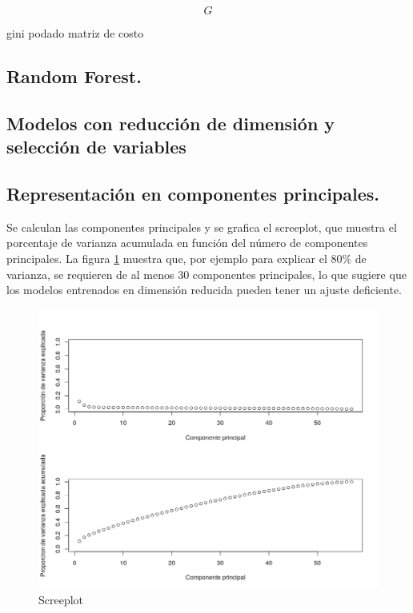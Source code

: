 \documentclass[12pt, letterpaper]{article}
\begin{document}
$$ G $$ 

gini
podado
matriz de costo

\subsection{Random Forest.}

\subsection{Modelos con reducción de dimensión y selección de variables}

\subsection{Representación en componentes principales.}

Se calculan las componentes principales y se grafica el screeplot, que muestra el porcentaje de varianza acumulada en función del número de componentes principales. La figura \ref{screeplot} muestra que, por ejemplo para explicar el $80\%$ de varianza, se requieren de al menos $30$ componentes principales, 
lo que sugiere que los modelos entrenados en dimensión reducida pueden tener un ajuste deficiente.

\begin{figure}[h]
\centering
	\includegraphics[scale=.5]{images/pca.png} 
	\caption{Screeplot}
		\label{screeplot}
\end{figure}
\end{document}
